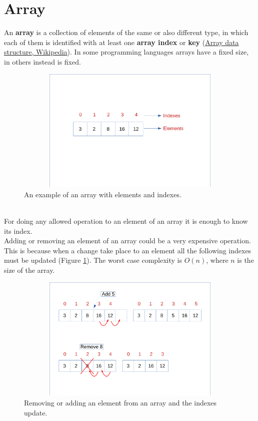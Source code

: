 \section{Array}
An \textbf{array} is a collection of elements of the same or also different type, in which each of them is identified with at least one \textbf{array index} or \textbf{key} \cite{wikiarray} (\href{https://en.wikipedia.org/wiki/Array_data_structure}{Array data structure, Wikipedia}). In some programming languages arrays have a fixed size, in others instead is fixed.
\begin{figure}[hb]
	\includegraphics[width=14cm,height=6cm]{chapters/datastructures/images/array_1.pdf}
	\caption[]{An example of an array with elements and indexes.}
\end{figure}
\\
For doing any allowed operation to an element of an array it is enough to know its index. 
\\
Adding or removing an element of an array could be a very expensive operation. This is because when a change take place to an element all the following indexes must be updated (Figure \ref{array_2}). The worst case complexity is \(O(n)\), where \(n\) is the size of the array.
\begin{figure}[hb]
	\includegraphics[width=14cm,height=6cm]{chapters/datastructures/images/array_2.pdf}
	\caption[]{Removing or adding an element from an array and the indexes update. }
	\label{array_2}
\end{figure}

